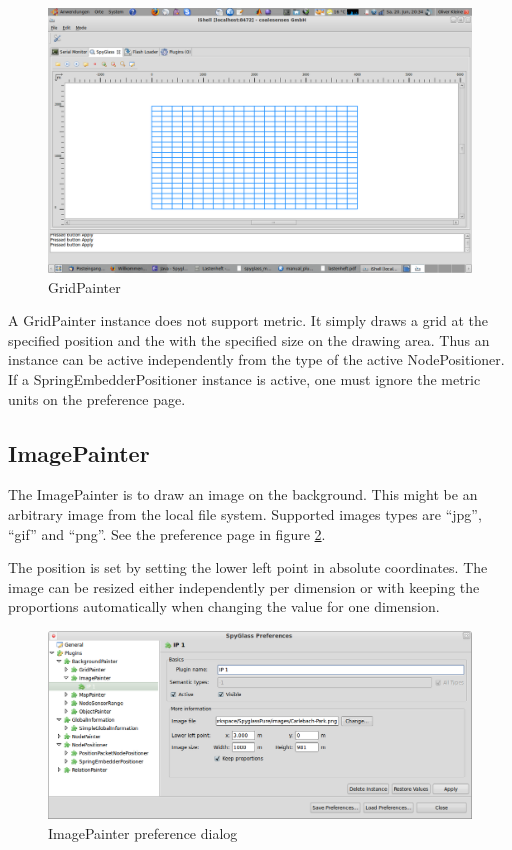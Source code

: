 \begin{figure}[htb]
  \begin{center}
    \includegraphics[width=13.2cm]{./pics/gridpainter}
    \caption{GridPainter}
    \label{pic:gp}
  \end{center}
\end{figure}

A GridPainter instance does not support metric. It simply draws a grid at the specified position and the with
the specified size on the drawing area. Thus an instance can be active independently from the type of the
active NodePositioner. If a SpringEmbedderPositioner instance is active, one must ignore the metric units
on the preference page.

\subsection{ImagePainter}

The ImagePainter is to draw an image on the background. This might be an arbitrary image from the local file system.
Supported images types are ``jpg'', ``gif'' and ``png''. See the preference page in figure \ref{pic:ip_preferences}.

The position is set by setting the lower left point in absolute coordinates. The image can be resized either
independently per dimension or with keeping the proportions automatically when changing the value for one dimension.

\begin{figure}[htb]
  \begin{center}
    \includegraphics[width=13.2cm]{./pics/imagepainter_prefpage}
    \caption{ImagePainter preference dialog}
    \label{pic:ip_preferences}
  \end{center}
\end{figure}

